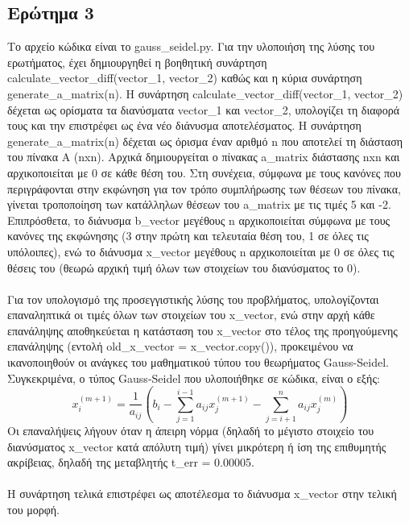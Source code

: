 \documentclass[a4paper,11pt]{article}
\newcommand{\lt}{\latintext}
\begin{document}
\subsection*{Ερώτημα 3}
Το αρχείο κώδικα είναι το {\lt gauss\_seidel.py}.
Για την υλοποιήση της λύσης του ερωτήματος, έχει δημιουργηθεί η βοηθητική συνάρτηση {\lt calculate\_vector\_diff(vector\_1, vector\_2)} καθώς και η κύρια συνάρτηση {\lt generate\_a\_matrix(n)}.
Η συνάρτηση {\lt calculate\_vector\_diff(vector\_1, vector\_2)} δέχεται ως ορίσματα τα διανύσματα {\lt vector\_1} και {\lt vector\_2}, υπολογίζει τη διαφορά τους και την επιστρέφει ως ένα νέο διάνυσμα αποτελέσματος.
Η συνάρτηση {\lt generate\_a\_matrix(n)} δέχεται ως όρισμα έναν αριθμό {\lt n} που αποτελεί τη διάσταση του πίνακα Α ({\lt nxn}). Αρχικά δημιουργείται ο πίνακας {\lt a\_matrix} διάστασης {\lt nxn} και αρχικοποιείται με 0 σε κάθε θέση του. Στη συνέχεια, σύμφωνα με τους κανόνες που περιγράφονται στην εκφώνηση για τον τρόπο συμπλήρωσης των θέσεων του πίνακα, γίνεται τροποποίηση των κατάλληλων θέσεων του {\lt a\_matrix} με τις τιμές 5 και -2. Επιπρόσθετα, το διάνυσμα {\lt b\_vector} μεγέθους {\lt n} αρχικοποιείται σύμφωνα με τους κανόνες της εκφώνησης (3 στην πρώτη και τελευταία θέση του, 1 σε όλες τις υπόλοιπες), ενώ το διάνυσμα {\lt x\_vector } μεγέθους {\lt n} αρχικοποιείται με 0 σε όλες τις θέσεις του (θεωρώ αρχική τιμή όλων των στοιχείων του διανύσματος το 0).\\
\\ Για τον υπολογισμό της προσεγγιστικής  λύσης του προβλήματος, υπολογίζονται επαναληπτικά οι τιμές όλων των στοιχείων του {\lt x\_vector}, ενώ στην αρχή κάθε επανάληψης αποθηκεύεται η κατάσταση του {\lt x\_vector} στο τέλος της προηγούμενης επανάληψης (εντολή old\_x\_vector = x\_vector.copy()), προκειμένου να ικανοποιηθούν οι ανάγκες του μαθηματικού τύπου του θεωρήματος {\lt Gauss-Seidel}.  
Συγκεκριμένα, ο τύπος {\lt Gauss-Seidel} που υλοποιήθηκε σε κώδικα, είναι ο εξής:
\begin{equation*}
x_{i}^{(m+1)} = \frac{1}{a_{ij}}  \left( b_{i} - \sum_{j=1}^{i-1} a_{ij} x_{j}^{(m+1)} - \sum_{j=i+1}^{n} a_{ij} x_{j}^{(m)} \right)
\end{equation*}
Οι επαναλήψεις λήγουν όταν η άπειρη νόρμα (δηλαδή το μέγιστο στοιχείο του διανύσματος {\lt x_vector} κατά απόλυτη τιμή) γίνει μικρότερη ή ίση της επιθυμητής ακρίβειας, δηλαδή της μεταβλητής {\lt t\_err = 0.00005}.\\
\\Η συνάρτηση τελικά επιστρέφει ως αποτέλεσμα το διάνυσμα {x\_vector} στην τελική του μορφή.
\end{document}
